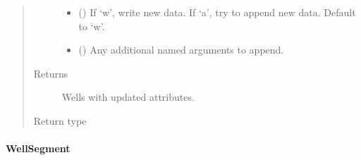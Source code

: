 \documentclass[letterpaper,10pt,english]{sphinxmanual}
\begin{document}
\begin{fulllineitems}
\begin{fulllineitems}
\begin{quote}
\begin{description}
\begin{itemize}
\item {} 
 (\sphinxstyleliteralemphasis{\sphinxupquote{, }}) \textendash{} If ‘w’, write new data. If ‘a’, try to append new data. Default to ‘w’.

\item {} 
 () \textendash{} Any additional named arguments to append.

\end{itemize}

\item[{Returns}] \leavevmode
{} \textendash{} Wells with updated attributes.

\item[{Return type}] \leavevmode
{\hyperref[\detokenize{api/wells:geology.src.wells.Wells}]{}}

\end{description}\end{quote}

\end{fulllineitems}


\end{fulllineitems}



\paragraph{WellSegment}
\label{\detokenize{api/wells:wellsegment}}
\end{document}
